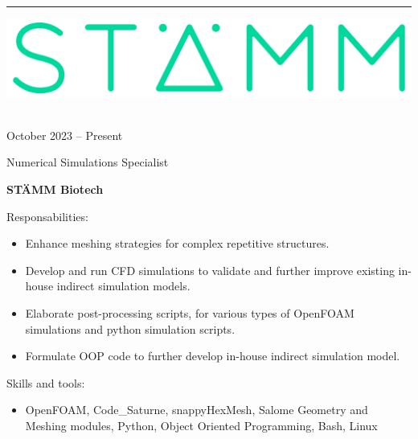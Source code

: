 \documentclass[a4paper,10pt]{article}
\newlength{\cvcolumngapwidth}
\newlength{\cvleftcolumnwidth}
\newlength{\cvrightcolumnwidth}
\newcommand{\cvsectionstyle}[1]{{\normalsize\cvsectionfont\textcolor{cvsectioncolor}{#1}}}
\newcommand{\cvtitlestyle}[1]{{\large\cvtitlefont\textcolor{cvtitlecolor}{#1}}}
\newcommand{\cvdurationstyle}[1]{{\small\cvdurationfont\textcolor{cvdurationcolor}{#1}}}
\newlength{\cvafteritemskipamount}
\newlength{\cvaftersectionskipamount}
\newlength{\cvaftertitleskipamount}
\newlength{\cvparskip}
\newcommand{\cvsection}[1]{
    \begin{minipage}[t]{\cvleftcolumnwidth}
        \raggedleft\cvsectionstyle{#1}
    \end{minipage}%
    \hspace{\cvcolumngapwidth}%
    \begin{minipage}[t]{\cvrightcolumnwidth}
        \textcolor{cvrulecolor}{\rule{\cvrightcolumnwidth}{0.3mm}}
    \end{minipage}

    \vspace{\cvaftersectionskipamount}
}
\newcommand{\cvitem}[2]{
    \begin{minipage}[t]{\cvleftcolumnwidth}
        \raggedleft #1
    \end{minipage}%
    \hspace{\cvcolumngapwidth}%
    \begin{minipage}[t]{\cvrightcolumnwidth}
        \setlength{\parskip}{\cvparskip} #2
    \end{minipage}

    \vspace{\cvafteritemskipamount}
}
\newcommand{\cvtitle}[1]{
    \cvtitlestyle{#1}

    \vspace{\cvaftertitleskipamount}
    \vspace{-\cvparskip}
}
\begin{document}
\cvsection{WORK EXPERIENCE}

\cvitem{
	\begin{minipage}{\textwidth}
    \begin{flushright}
		  \includegraphics[height=0.15\textwidth]{../logos-photos/Logo_STAMM.png}   
    \end{flushright}  
  \end{minipage} \\
  \vspace{0.3cm}
  \cvdurationstyle{October 2023 -- Present}\\
}{
	
  \cvtitle{Numerical Simulations Specialist}
  \textbf{\large STÄMM Biotech}
  
  Responsabilities:
  \begin{itemize}
    \item Enhance meshing strategies for complex repetitive structures. 
    \item Develop and run CFD simulations to validate and further improve existing in-house indirect simulation models.
    \item Elaborate post-processing scripts, for various types of OpenFOAM simulations and python simulation scripts.
    \item Formulate OOP code to further develop in-house indirect simulation model.
  \end{itemize}
  
  Skills and tools:
  \begin{itemize}
    \item OpenFOAM, Code\_Saturne, snappyHexMesh, Salome Geometry and Meshing modules, Python, Object Oriented
      Programming, Bash, Linux 
  \end{itemize}
	
}
\end{document}
